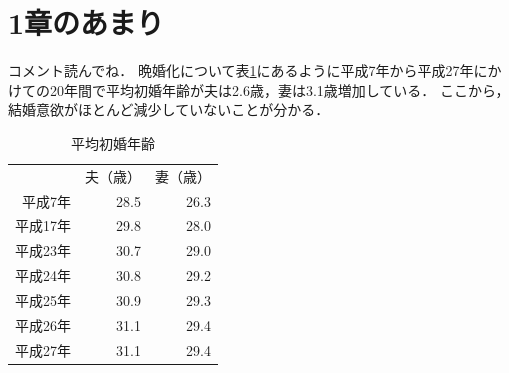 \documentclass[12pt]{ltjsarticle}
\begin{document}
\section{1章のあまり}
コメント読んでね．
晩婚化について表\ref{table:shokon}にあるように平成7年から平成27年にかけての20年間で平均初婚年齢が夫は2.6歳，妻は3.1歳増加している．
ここから，結婚意欲がほとんど減少していないことが分かる．
\begin{table}[ht]
\centering
  \caption{平均初婚年齢}
  \label{table:shokon}
  \begin{tabular}{rrr}
   & 夫（歳） & 妻（歳） \\
  平成7年 & 28.5 & 26.3 \\
  平成17年 & 29.8 & 28.0 \\
  平成23年 & 30.7 & 29.0 \\
  平成24年 & 30.8 & 29.2 \\
  平成25年 & 30.9 & 29.3 \\
  平成26年 & 31.1 & 29.4 \\
  平成27年 & 31.1 & 29.4 \\
  \end{tabular}
  \end{table}


\end{document}
